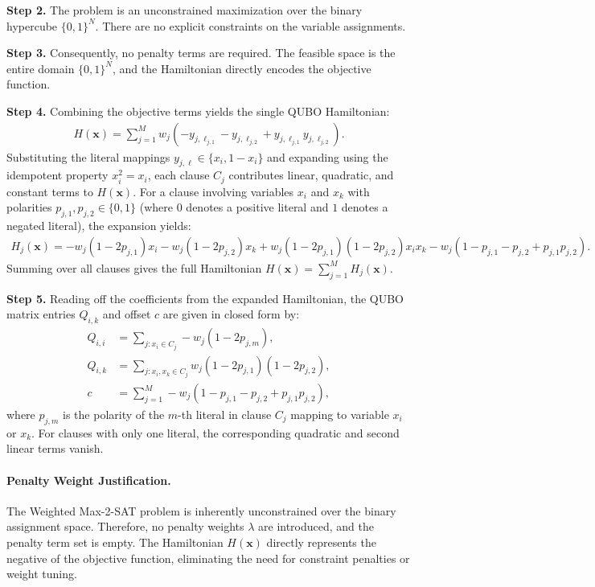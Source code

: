 \documentclass[12pt]{article}
\begin{document}
\textbf{Step 2.} The problem is an unconstrained maximization over the binary hypercube $\{0,1\}^N$. There are no explicit constraints on the variable assignments.

\textbf{Step 3.} Consequently, no penalty terms are required. The feasible space is the entire domain $\{0,1\}^N$, and the Hamiltonian directly encodes the objective function.

\textbf{Step 4.} Combining the objective terms yields the single QUBO Hamiltonian:
\begin{align}
    H(\mathbf{x}) = \sum_{j=1}^M w_j \left( -y_{j,\ell_{j,1}} - y_{j,\ell_{j,2}} + y_{j,\ell_{j,1}}y_{j,\ell_{j,2}} \right).
\end{align}
Substituting the literal mappings $y_{j,\ell} \in \{x_i, 1-x_i\}$ and expanding using the idempotent property $x_i^2 = x_i$, each clause $C_j$ contributes linear, quadratic, and constant terms to $H(\mathbf{x})$. For a clause involving variables $x_i$ and $x_k$ with polarities $p_{j,1}, p_{j,2} \in \{0,1\}$ (where $0$ denotes a positive literal and $1$ denotes a negated literal), the expansion yields:
\begin{align}
    H_j(\mathbf{x}) = -w_j(1-2p_{j,1})x_i - w_j(1-2p_{j,2})x_k + w_j(1-2p_{j,1})(1-2p_{j,2})x_i x_k - w_j(1 - p_{j,1} - p_{j,2} + p_{j,1}p_{j,2}).
\end{align}
Summing over all clauses gives the full Hamiltonian $H(\mathbf{x}) = \sum_{j=1}^M H_j(\mathbf{x})$.

\textbf{Step 5.} Reading off the coefficients from the expanded Hamiltonian, the QUBO matrix entries $Q_{i,k}$ and offset $c$ are given in closed form by:
\begin{align}
    Q_{i,i} &= \sum_{j: x_i \in C_j} -w_j(1-2p_{j,m}), \\
    Q_{i,k} &= \sum_{j: x_i, x_k \in C_j} w_j(1-2p_{j,1})(1-2p_{j,2}), \\
    c &= \sum_{j=1}^M -w_j(1 - p_{j,1} - p_{j,2} + p_{j,1}p_{j,2}),
\end{align}
where $p_{j,m}$ is the polarity of the $m$-th literal in clause $C_j$ mapping to variable $x_i$ or $x_k$. For clauses with only one literal, the corresponding quadratic and second linear terms vanish.

\paragraph{Penalty Weight Justification.}
The Weighted Max-2-SAT problem is inherently unconstrained over the binary assignment space. Therefore, no penalty weights $\lambda$ are introduced, and the penalty term set is empty. The Hamiltonian $H(\mathbf{x})$ directly represents the negative of the objective function, eliminating the need for constraint penalties or weight tuning.
\end{document}
